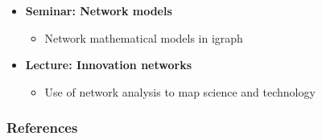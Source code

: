 \documentclass[8pt]{beamer}
\begin{document}

\begin{frame}
\frametitle{\insertsection}

\begin{itemize}

\item 	\textbf{Seminar: Network models}
	\begin{itemize}
	\item Network mathematical models in igraph
	\end{itemize}
	

\medskip
\medskip

\item 	\textbf{Lecture: Innovation networks}
	\begin{itemize}
	\item Use of network analysis to map science and technology
	\end{itemize}	

		
\end{itemize}

\end{frame}








\begin{frame}[allowframebreaks]
\frametitle{References}
\tiny


\end{frame}
\end{document}
